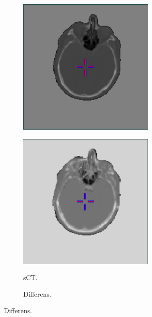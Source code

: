 \begin{figure}
\begin{subfigure}[b]{0.3\textwidth}
        \includegraphics[width=0.75\textwidth]{colager/loocv_ct/loocv_011030_ct.png}
        \label{col:loocv_ct_pat5_ct}
    \end{subfigure}\hfill
    \begin{subfigure}[b]{0.3\textwidth}
        \caption{sCT.}
        \includegraphics[width=0.75\textwidth]{colager/loocv_ct/loocv_011030_sct.png}
        \label{col:loocv_ct_pat5_sct}
    \end{subfigure}\hfill
    \begin{subfigure}[b]{0.3\textwidth}
        \caption{Differens.}

\end{subfigure}
\end{figure}

